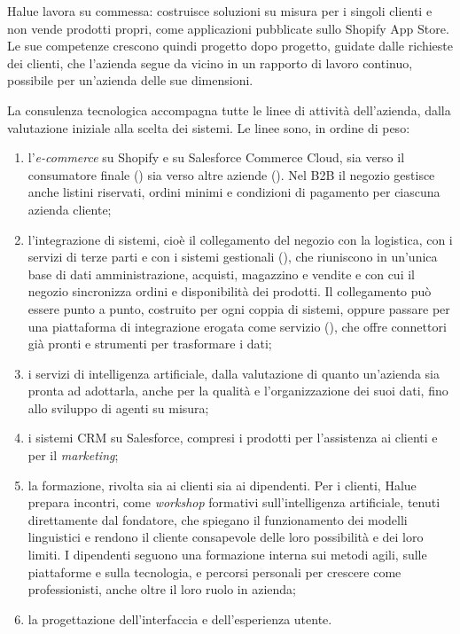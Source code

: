 Halue lavora su commessa: costruisce soluzioni su misura per i singoli clienti e non vende prodotti
propri, come applicazioni pubblicate sullo Shopify App Store. Le sue competenze crescono quindi
progetto dopo progetto, guidate dalle richieste dei clienti, che l’azienda segue da vicino in un
rapporto di lavoro continuo, possibile per un’azienda delle sue dimensioni.

La consulenza tecnologica accompagna tutte le linee di attività dell’azienda, dalla valutazione
iniziale alla scelta dei sistemi. Le linee sono, in ordine di peso:

\begin{enumerate}
        \item l’\emph{e-commerce} su Shopify e su Salesforce Commerce Cloud, sia verso il
	consumatore finale () sia verso altre aziende (). Nel B2B il
	negozio gestisce anche listini riservati, ordini minimi e condizioni di pagamento per ciascuna
	azienda cliente;
        \item l’integrazione di sistemi, cioè il collegamento del negozio con la logistica, con i
	servizi di terze parti e con i sistemi gestionali (), che riuniscono in un’unica
	base di dati amministrazione, acquisti, magazzino e vendite e con cui il negozio sincronizza ordini
	e disponibilità dei prodotti. Il collegamento può essere punto a punto, costruito per ogni coppia di
	sistemi, oppure passare per una piattaforma di integrazione erogata come servizio
	(), che offre connettori già pronti e strumenti per trasformare i dati;
        \item i servizi di intelligenza artificiale, dalla valutazione di quanto un’azienda sia
	pronta ad adottarla, anche per la qualità e l’organizzazione dei suoi dati, fino allo sviluppo di
	agenti su misura;
	\item i sistemi CRM su Salesforce, compresi i prodotti per l’assistenza ai clienti e per il
	\emph{marketing};
	\item la formazione, rivolta sia ai clienti sia ai dipendenti. Per i clienti, Halue prepara
	incontri, come \emph{workshop} formativi sull’intelligenza artificiale, tenuti direttamente dal
	fondatore, che spiegano il funzionamento dei modelli linguistici e rendono il cliente consapevole
	delle loro possibilità e dei loro limiti. I dipendenti seguono una formazione interna sui metodi
	agili, sulle piattaforme e sulla tecnologia, e percorsi personali per crescere come
	professionisti, anche oltre il loro ruolo in azienda;
	\item la progettazione dell’interfaccia e dell’esperienza utente.
\end{enumerate}

